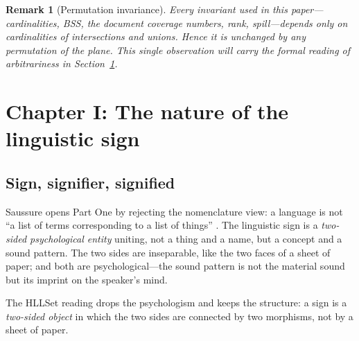 \documentclass[11pt,a4paper]{article}
\newtheorem{remark}[principle]{Remark}
\theoremstyle{remark}
\begin{document}
\begin{remark}[Permutation invariance]
\label{rem:perm}
Every invariant used in this paper---cardinalities, BSS, the document
coverage numbers, rank, spill---depends only on cardinalities of
intersections and unions.
Hence it is unchanged by any permutation of the plane. This single observation
will carry the formal reading of arbitrariness in Section~\ref{sec:ch1}.
\end{remark}

\section{Chapter I: The nature of the linguistic sign}
\label{sec:ch1}

\subsection{Sign, signifier, signified}
\label{sec:sign}

Saussure opens Part One by rejecting the nomenclature view: a language is not
``a list of terms corresponding to a list of things'' \cite[Part I, ch.~I,
\S1]{harris1983}. The linguistic sign is a \emph{two-sided psychological
entity} uniting, not a thing and a name, but a concept and a sound pattern.
The two sides are inseparable, like the two faces of a sheet of paper; and both
are psychological---the sound pattern is not the material sound but its
imprint on the speaker's mind.

The HLLSet reading drops the psychologism and keeps the structure: a sign is a
\emph{two-sided object} in which the two sides are connected by two morphisms,
not by a sheet of paper.
\end{document}
